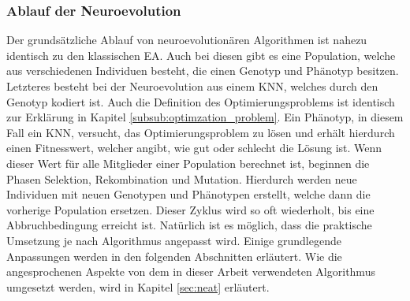 \subsubsection{Ablauf der Neuroevolution}
Der grundsätzliche Ablauf von neuroevolutionären Algorithmen ist nahezu identisch zu den klassischen \ac{EA}. Auch bei diesen gibt es eine Population, welche aus verschiedenen Individuen besteht, die einen Genotyp und Phänotyp besitzen. Letzteres besteht bei der Neuroevolution aus einem \ac{KNN}, welches durch den Genotyp kodiert ist. Auch die Definition des Optimierungsproblems ist identisch zur Erklärung in Kapitel \ref{subsub:optimzation_problem}. Ein Phänotyp, in diesem Fall ein \ac{KNN}, versucht, das Optimierungsproblem zu lösen und erhält hierdurch einen Fitnesswert, welcher angibt, wie gut oder schlecht die Lösung ist. Wenn dieser Wert für alle Mitglieder einer Population berechnet ist, beginnen die Phasen Selektion, Rekombination und Mutation. Hierdurch werden neue Individuen mit neuen Genotypen und Phänotypen erstellt, welche dann die vorherige Population ersetzen. Dieser Zyklus wird so oft wiederholt, bis eine Abbruchbedingung erreicht ist. Natürlich ist es möglich, dass die praktische Umsetzung je nach Algorithmus angepasst wird. Einige grundlegende Anpassungen werden in den folgenden Abschnitten erläutert. Wie die angesprochenen Aspekte von dem in dieser Arbeit verwendeten Algorithmus umgesetzt werden, wird in Kapitel \ref{sec:neat} erläutert.

